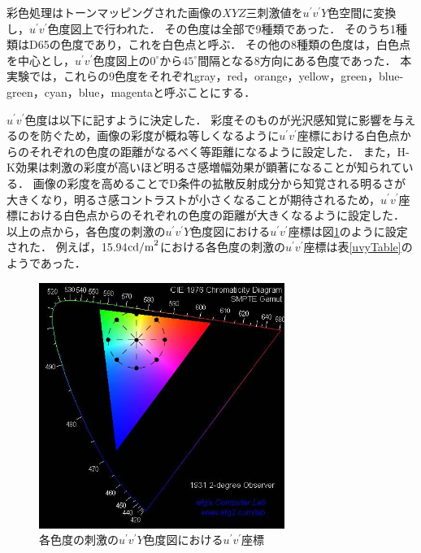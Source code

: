                 彩色処理はトーンマッピングされた画像の$XYZ$三刺激値を$u^{\prime}v^{\prime}Y$色空間に変換し，$u^{\prime}v^{\prime}$色度図上で行われた．
                その色度は全部で9種類であった．
                そのうち1種類はD65の色度であり，これを白色点と呼ぶ．
                その他の8種類の色度は，白色点を中心とし，$u^{\prime}v^{\prime}$色度図上の$0^{\circ}$から$45^{\circ}$間隔となる8方向にある色度であった．
                本実験では，これらの9色度をそれぞれgray，red，orange，yellow，green，blue-green，cyan，blue，magentaと呼ぶことにする．

                $u^{\prime}v^{\prime}$色度は以下に記すように決定した．
                彩度そのものが光沢感知覚に影響を与えるのを防ぐため，画像の彩度が概ね等しくなるように$u^{\prime}v^{\prime}$座標における白色点からのそれぞれの色度の距離がなるべく等距離になるように設定した．
                また，H-K効果は刺激の彩度が高いほど明るさ感増幅効果が顕著になることが知られている．
                画像の彩度を高めることでD条件の拡散反射成分から知覚される明るさが大きくなり，明るさ感コントラストが小さくなることが期待されるため，$u^{\prime}v^{\prime}$座標における白色点からのそれぞれの色度の距離が大きくなるように設定した．
                以上の点から，各色度の刺激の$u^{\prime}v^{\prime}Y$色度図における$u^{\prime}v^{\prime}$座標は図\ref{uvy}のように設定された．
                例えば，15.94${\rm cd/m}^2$における各色度の刺激の$u^{\prime}v^{\prime}$座標は表\ref{uvyTable}のようであった．

                \begin{figure}[h]
                    \centering
                    \includegraphics[width=8.0cm]{./img/CIE1976.jpg}
                    \caption{各色度の刺激の$u^{\prime}v^{\prime}Y$色度図における$u^{\prime}v^{\prime}$座標}
                    \label{uvy}
                \end{figure}


